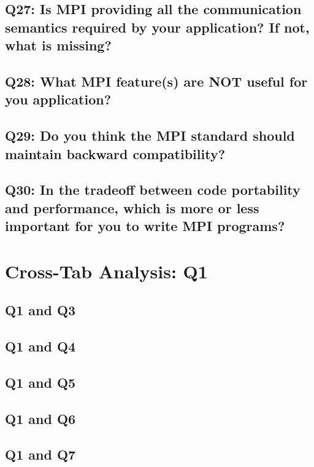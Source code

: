 \documentclass{report}
\begin{document}
\clearpage
\section{Q27: Is MPI providing all the communication semantics required by your application? If not, what is missing?}


\clearpage
\section{Q28: What MPI feature(s) are NOT useful for you application?}


\clearpage
\section{Q29: Do you think the MPI standard should maintain backward compatibility?}


\clearpage
\section{Q30: In the tradeoff between code portability and performance, which is more or less important for you to write MPI programs?}


\chapter{Cross-Tab Analysis: Q1}

\section{Q1 and Q3}


\clearpage
\section{Q1 and Q4}


\clearpage
\section{Q1 and Q5}


\clearpage
\section{Q1 and Q6}


\clearpage
\section{Q1 and Q7}

\end{document}
